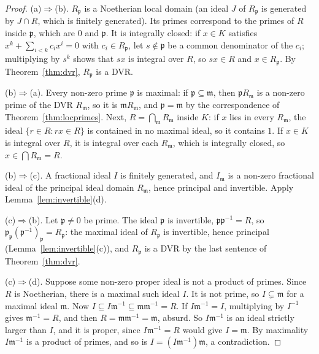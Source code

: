 \begin{proof}
(a)$\Rightarrow$(b). $R_{\mathfrak p}$ is a Noetherian local domain (an ideal $J$ of $R_{\mathfrak p}$ is generated by $J\cap R$, which is finitely generated). Its primes correspond to the primes of $R$ inside
$\mathfrak p$, which are $0$ and $\mathfrak p$. It is integrally closed: if $x\in K$ satisfies $x^k+\sum_{i<k}c_ix^i=0$ with $c_i\in R_{\mathfrak p}$, let $s\notin\mathfrak p$ be a common denominator of the $c_i$; multiplying by
$s^k$ shows that $sx$ is integral over $R$, so $sx\in R$ and $x\in R_{\mathfrak p}$. By Theorem~\ref{thm:dvr}, $R_{\mathfrak p}$ is a DVR.

(b)$\Rightarrow$(a). Every non-zero prime $\mathfrak p$ is maximal: if $\mathfrak p\subseteq\mathfrak m$, then $\mathfrak pR_{\mathfrak m}$ is a non-zero prime of the DVR $R_{\mathfrak m}$, so it is $\mathfrak mR_{\mathfrak m}$, and $\mathfrak p=\mathfrak m$
by the correspondence of Theorem~\ref{thm:locprimes}. Next, $R=\bigcap_{\mathfrak m}R_{\mathfrak m}$ inside $K$: if $x$ lies in every $R_{\mathfrak m}$, the ideal $\{r\in R:rx\in R\}$ is contained in no maximal ideal, so it contains $1$.
If $x\in K$ is integral over $R$, it is integral over each $R_{\mathfrak m}$, which is integrally closed, so $x\in\bigcap R_{\mathfrak m}=R$.

(b)$\Rightarrow$(c). A fractional ideal $I$ is finitely generated, and $I_{\mathfrak m}$ is a non-zero fractional ideal of the principal ideal domain $R_{\mathfrak m}$, hence principal and invertible. Apply Lemma~\ref{lem:invertible}(d).

(c)$\Rightarrow$(b). Let $\mathfrak p\ne0$ be prime. The ideal $\mathfrak p$ is invertible, $\mathfrak p\mathfrak p^{-1}=R$, so $\mathfrak p_{\mathfrak p}(\mathfrak p^{-1})_{\mathfrak p}=R_{\mathfrak p}$: the maximal ideal of $R_{\mathfrak p}$ is invertible,
hence principal (Lemma~\ref{lem:invertible}(c)), and $R_{\mathfrak p}$ is a DVR by the last sentence of Theorem~\ref{thm:dvr}.

(c)$\Rightarrow$(d). Suppose some non-zero proper ideal is not a product of primes. Since $R$ is Noetherian, there is a maximal such ideal $I$. It is not prime, so $I\subsetneq\mathfrak m$ for a maximal ideal $\mathfrak m$. Now
$I\subseteq I\mathfrak m^{-1}\subseteq\mathfrak m\mathfrak m^{-1}=R$. If $I\mathfrak m^{-1}=I$, multiplying by $I^{-1}$ gives $\mathfrak m^{-1}=R$, and then $R=\mathfrak m\mathfrak m^{-1}=\mathfrak m$, absurd. So $I\mathfrak m^{-1}$ is an
ideal strictly larger than $I$, and it is proper, since $I\mathfrak m^{-1}=R$ would give $I=\mathfrak m$. By maximality $I\mathfrak m^{-1}$ is a product of primes, and so is $I=(I\mathfrak m^{-1})\mathfrak m$, a contradiction.


\end{proof}
